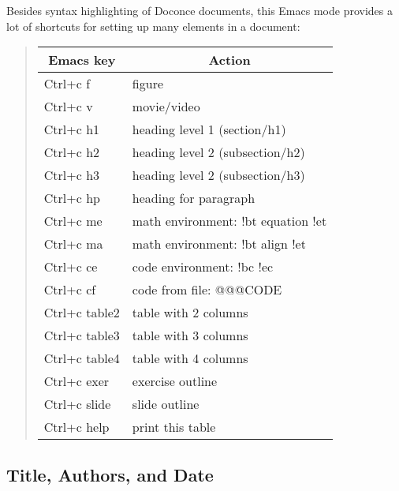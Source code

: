 \documentclass[%
oneside,                 %
final,                   %
10pt]{article}
\begin{document}
Besides syntax highlighting of Doconce documents, this Emacs mode
provides a lot of shortcuts for setting up many elements in a document:


\begin{quote}\begin{tabular}{ll}
\hline
\multicolumn{1}{c}{ Emacs key } & \multicolumn{1}{c}{ Action } \\
\hline
Ctrl+c f                           & figure                             \\
Ctrl+c v                           & movie/video                        \\
Ctrl+c h1                          & heading level 1 (section/h1)       \\
Ctrl+c h2                          & heading level 2 (subsection/h2)    \\
Ctrl+c h3                          & heading level 2 (subsection/h3)    \\
Ctrl+c hp                          & heading for paragraph              \\
Ctrl+c me                          & math environment: !bt equation !et \\
Ctrl+c ma                          & math environment: !bt align !et    \\
Ctrl+c ce                          & code environment: !bc !ec          \\
Ctrl+c cf                          & code from file: @@@CODE            \\
Ctrl+c table2                      & table with 2 columns               \\
Ctrl+c table3                      & table with 3 columns               \\
Ctrl+c table4                      & table with 4 columns               \\
Ctrl+c exer                        & exercise outline                   \\
Ctrl+c slide                       & slide outline                      \\
Ctrl+c help                        & print this table                   \\
\hline
\end{tabular}\end{quote}

\noindent
\subsection{Title, Authors, and Date}
\end{document}
